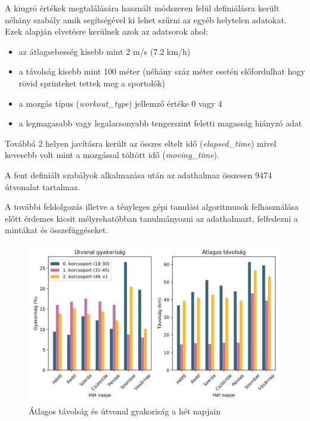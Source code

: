 A kiugró értékek megtalálására használt módszeren felül definiálásra került néhány szabály amik segítségével ki lehet szűrni az egyéb helytelen adatokat. Ezek alapján elvetésre kerülnek azok az adatsorok ahol:
\begin{itemize}
	\item az átlagsebesség kisebb mint 2 m/s (7.2 km/h)
	\item a távolság kisebb mint 100 méter (néhány száz méter esetén előfordulhat hogy rövid sprinteket tettek meg a sportolók)
	\item a mozgás típus (\textit{workout\_type}) jellemző értéke 0 vagy 4
	\item a legmagasabb vagy legalacsonyabb tengerszint feletti magasság hiányzó adat
\end{itemize} 
Továbbá 2 helyen javításra került az összes eltelt idő (\textit{elapsed\_time}) mivel kevesebb volt mint a mozgással töltött idő (\textit{moving\_time}).


A fent definiált szabályok alkalmazása után  az adathalmaz összesen 9474 útvonalat tartalmaz.


A további feldolgozás illetve a tényleges gépi tanulási algoritmusok felhasználása előtt érdemes kicsit mélyrehatóbban tanulmányozni az adathalmazt, felfedezni a mintákat és összefüggéseket. 



\begin{figure}
	\centering
	\includegraphics[width=\linewidth,keepaspectratio]{kepek/data_insights/FrequencyAndDistanceOnWeekDays.png}
	\caption{Átlagos távolság és útvonal gyakoriság a hét napjain}
	\label{fig:distanceAndFrequencyByWeekdays}
\end{figure}



